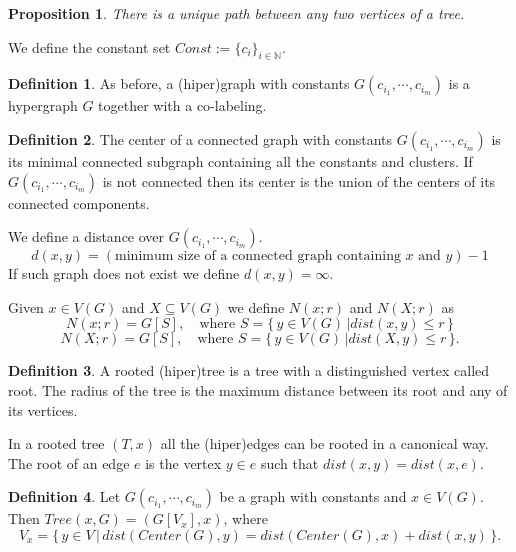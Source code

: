 \documentclass[11pt,notitlepage]{report}
\newtheorem{proposition}{Proposition}[chapter]
\theoremstyle{definition}
\newtheorem{definition}{Definition}[chapter]
\theoremstyle{remark}
\newcommand{\N}{\mathbb{N}}
\newcommand{\clist}{c_{i_1}, \cdots, c_{i_m}}
\begin{document}
\begin{proposition} There is a unique path between any two vertices of a tree. 
\end{proposition}


We define the constant set $Const:=\{c_i\}_{i\in \N}$.

\begin{definition} 
	As before, a (hiper)graph with constants $G(\clist)$ is a hypergraph 
	$G$ together with a co-labeling. 
\end{definition}

\begin{definition}
	The center of a connected graph with constants $G(\clist)$ is its minimal 
	connected subgraph containing all the constants and clusters. If $G(\clist)$
	is not connected then its center is the union of the centers of its connected
	components.   
\end{definition}

We define a distance over $G(\clist)$.
\[ d(x,y)= (\text{minimum size of a connected graph containing }x \text{ and } y) - 1 \]
If such graph does not exist we define $d(x,y)=\infty$.\par

Given $x\in V(G)$ and $X\subseteq V(G)$ we define $N(x;r)$ and $N(X;r)$ as
\[ N(x;r)= G[S], \quad \text{where } S=\{\, y\in V(G) \, | dist(x,y)\leq r \, \} \]
\[ N(X;r)= G[S], \quad \text{where } S=\{\, y\in V(G) \, | dist(X,y)\leq r \, \}. \]

\begin{definition}
	 A rooted (hiper)tree is a tree with a distinguished vertex called root.
	 The radius of the tree is the maximum distance between its root and any
	 of its vertices.  
\end{definition}

In a rooted tree $(T,x)$ all the (hiper)edges can be rooted in a canonical way. 
The root of an edge $e$ is the vertex $y\in e$ such that $dist(x,y)=dist(x,e)$.

\begin{definition}
	Let $G(\clist)$ be a graph with constants and $x\in V(G)$. Then
	$Tree(x,G)=(G[V_x],x)$, where
	\[ V_x= \{\, y\in V \, | \, dist(Center(G),y)= dist(Center(G),x)+ dist(x,y) \,	 \}. \]
\end{definition}
\end{document}
